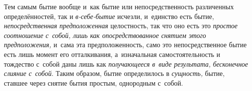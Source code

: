 Тем самым бытие вообще и~как бытие или непосредственность различенных
определённостей, так и {\em в-себе-бытие} исчезли, и~единство есть бытие,
{\em непосредственная предположенная} целостность, так что оно есть это
{\em простое соотношение с~собой, лишь как опосредствованное снятием
этого предположения,} и~сама эта предположенность, само это непосредственное
бытие есть лишь момент его отталкивания, а~изначальная самостоятельность и
тождество с~собой даны лишь как {\em получающееся в~виде результата,}
{\em бесконечное слияние с~собой}. Таким образом, бытие определилось в
{\em сущность,} бытие, ставшее через снятие бытия простым, однородным с~собой.
